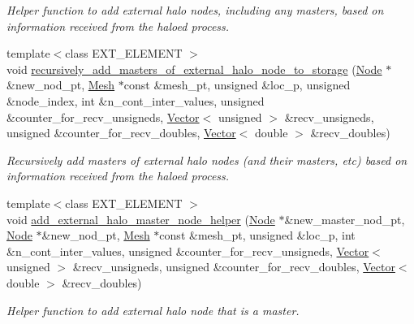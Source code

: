 \begin{DoxyCompactItemize}
\begin{DoxyCompactList}\small\item\em Helper function to add external halo nodes, including any masters, based on information received from the haloed process. \end{DoxyCompactList}\item 
{\footnotesize template$<$class E\+X\+T\+\_\+\+E\+L\+E\+M\+E\+NT $>$ }\\void \hyperlink{namespaceoomph_1_1Missing__masters__functions_a5aeedca2c5268a414d83fa7cfd023f14}{recursively\+\_\+add\+\_\+masters\+\_\+of\+\_\+external\+\_\+halo\+\_\+node\+\_\+to\+\_\+storage} (\hyperlink{classoomph_1_1Node}{Node} $\ast$\&new\+\_\+nod\+\_\+pt, \hyperlink{classoomph_1_1Mesh}{Mesh} $\ast$const \&mesh\+\_\+pt, unsigned \&loc\+\_\+p, unsigned \&node\+\_\+index, int \&n\+\_\+cont\+\_\+inter\+\_\+values, unsigned \&counter\+\_\+for\+\_\+recv\+\_\+unsigneds, \hyperlink{classoomph_1_1Vector}{Vector}$<$ unsigned $>$ \&recv\+\_\+unsigneds, unsigned \&counter\+\_\+for\+\_\+recv\+\_\+doubles, \hyperlink{classoomph_1_1Vector}{Vector}$<$ double $>$ \&recv\+\_\+doubles)
\begin{DoxyCompactList}\small\item\em Recursively add masters of external halo nodes (and their masters, etc) based on information received from the haloed process. \end{DoxyCompactList}\item 
{\footnotesize template$<$class E\+X\+T\+\_\+\+E\+L\+E\+M\+E\+NT $>$ }\\void \hyperlink{namespaceoomph_1_1Missing__masters__functions_a9e3bf04e14473cd6671c5b1f17bc4823}{add\+\_\+external\+\_\+halo\+\_\+master\+\_\+node\+\_\+helper} (\hyperlink{classoomph_1_1Node}{Node} $\ast$\&new\+\_\+master\+\_\+nod\+\_\+pt, \hyperlink{classoomph_1_1Node}{Node} $\ast$\&new\+\_\+nod\+\_\+pt, \hyperlink{classoomph_1_1Mesh}{Mesh} $\ast$const \&mesh\+\_\+pt, unsigned \&loc\+\_\+p, int \&n\+\_\+cont\+\_\+inter\+\_\+values, unsigned \&counter\+\_\+for\+\_\+recv\+\_\+unsigneds, \hyperlink{classoomph_1_1Vector}{Vector}$<$ unsigned $>$ \&recv\+\_\+unsigneds, unsigned \&counter\+\_\+for\+\_\+recv\+\_\+doubles, \hyperlink{classoomph_1_1Vector}{Vector}$<$ double $>$ \&recv\+\_\+doubles)
\begin{DoxyCompactList}\small\item\em Helper function to add external halo node that is a master. \end{DoxyCompactList}\item 

\end{DoxyCompactItemize}

